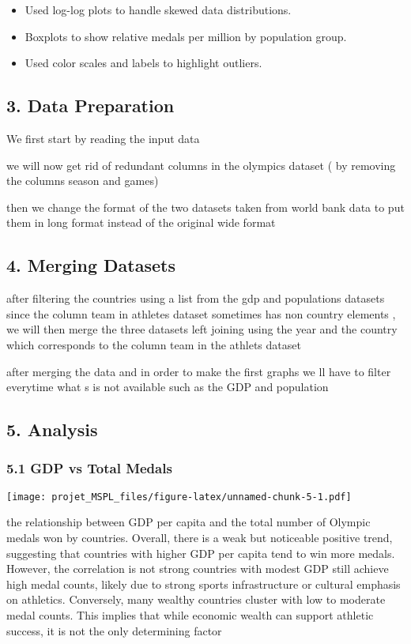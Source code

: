 \documentclass[
]{article}
\providecommand{\tightlist}{%
  \setlength{\itemsep}{0pt}\setlength{\parskip}{0pt}}
\begin{document}
\begin{itemize}
\tightlist
\item
  Used log-log plots to handle skewed data distributions.
\item
  Boxplots to show relative medals per million by population group.
\item
  Used color scales and labels to highlight outliers.
\end{itemize}

\subsection{3. Data Preparation}\label{data-preparation}

We first start by reading the input data

we will now get rid of redundant columns in the olympics dataset ( by
removing the columns season and games)

then we change the format of the two datasets taken from world bank data
to put them in long format instead of the original wide format

\subsection{4. Merging Datasets}\label{merging-datasets}

after filtering the countries using a list from the gdp and populations
datasets since the column team in athletes dataset sometimes has non
country elements , we will then merge the three datasets left joining
using the year and the country which corresponds to the column team in
the athlets dataset

after merging the data and in order to make the first graphs we ll have
to filter everytime what s is not available such as the GDP and
population

\subsection{5. Analysis}\label{analysis}

\subsubsection{5.1 GDP vs Total Medals}\label{gdp-vs-total-medals}

\texttt{[image: projet\_MSPL\_files/figure-latex/unnamed-chunk-5-1.pdf]}

the relationship between GDP per capita and the total number of Olympic
medals won by countries. Overall, there is a weak but noticeable
positive trend, suggesting that countries with higher GDP per capita
tend to win more medals. However, the correlation is not strong
countries with modest GDP still achieve high medal counts, likely due to
strong sports infrastructure or cultural emphasis on athletics.
Conversely, many wealthy countries cluster with low to moderate medal
counts. This implies that while economic wealth can support athletic
success, it is not the only determining factor
\end{document}
